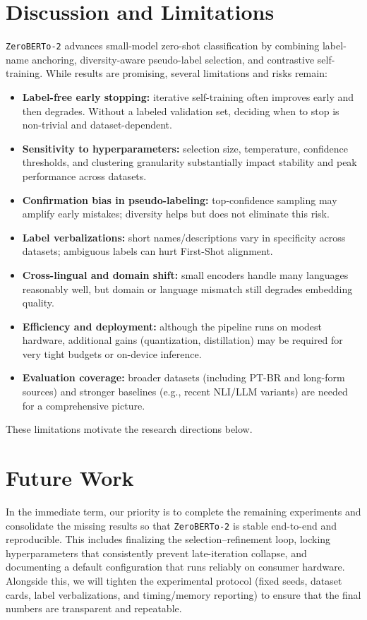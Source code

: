 \documentclass[]{politex-xico}
\begin{document}
\section{Discussion and Limitations}

\texttt{ZeroBERTo-2} advances small-model zero-shot classification by combining label-name anchoring, diversity-aware pseudo-label selection, and contrastive self-training. While results are promising, several limitations and risks remain:
\begin{itemize}
    \item \textbf{Label-free early stopping:} iterative self-training often improves early and then degrades. Without a labeled validation set, deciding when to stop is non-trivial and dataset-dependent.
    \item \textbf{Sensitivity to hyperparameters:} selection size, temperature, confidence thresholds, and clustering granularity substantially impact stability and peak performance across datasets.
    \item \textbf{Confirmation bias in pseudo-labeling: }top-confidence sampling may amplify early mistakes; diversity helps but does not eliminate this risk.
    \item \textbf{Label verbalizations: }short names/descriptions vary in specificity across datasets; ambiguous labels can hurt First-Shot alignment.
    \item \textbf{Cross-lingual and domain shift:} small encoders handle many languages reasonably well, but domain or language mismatch still degrades embedding quality.
    \item \textbf{Efficiency and deployment:} although the pipeline runs on modest hardware, additional gains (quantization, distillation) may be required for very tight budgets or on-device inference.
    \item \textbf{Evaluation coverage:} broader datasets (including PT-BR and long-form sources) and stronger baselines (e.g., recent NLI/LLM variants) are needed for a comprehensive picture.
\end{itemize}
These limitations motivate the research directions below.


\section{Future Work}
\label{sec:future_work}

In the immediate term, our priority is to complete the remaining experiments and consolidate the missing results so that \texttt{ZeroBERTo-2} is stable end-to-end and reproducible. This includes finalizing the selection–refinement loop, locking hyperparameters that consistently prevent late-iteration collapse, and documenting a default configuration that runs reliably on consumer hardware. Alongside this, we will tighten the experimental protocol (fixed seeds, dataset cards, label verbalizations, and timing/memory reporting) to ensure that the final numbers are transparent and repeatable.
\end{document}
